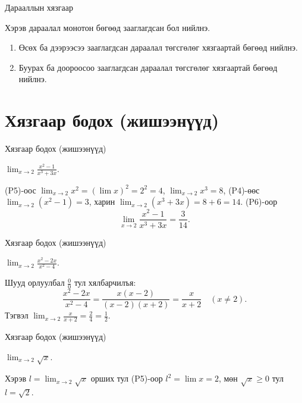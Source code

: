 \begin{frame}[allowframebreaks]{Дарааллын хязгаар}
\begin{theorem}\label{monton seq lim}
Хэрэв дараалал монотон бөгөөд зааглагдсан бол нийлнэ.  
\begin{enumerate}
\item Өсөх ба дээрээсээ зааглагдсан дараалал төгсгөлөг хязгаартай бөгөөд нийлнэ.  
\item Буурах ба доороосоо зааглагдсан дараалал төгсгөлөг хязгаартай бөгөөд нийлнэ.
\end{enumerate}
\end{theorem}
\end{frame}

\section{Хязгаар бодох (жишээнүүд)}
\begin{frame}[allowframebreaks]{Хязгаар бодох (жишээнүүд)}
\begin{example}
$\displaystyle \lim_{x\to 2}\frac{x^2-1}{x^3+3x}$.

(P5)-оос $\lim_{x\to 2}x^2=(\lim x)^2=2^2=4$, $\lim_{x\to 2}x^3=8$, (P4)-өөс $\lim_{x\to 2}(x^2-1)=3$, харин $\lim_{x\to 2}(x^3+3x)=8+6=14$. (P6)-оор
\[
\lim_{x\to 2}\frac{x^2-1}{x^3+3x}=\frac{3}{14}.
\]
\end{example}
\end{frame}

\begin{frame}[allowframebreaks]{Хязгаар бодох (жишээнүүд)}
\begin{example}
$\displaystyle \lim_{x\to 2}\frac{x^2-2x}{x^2-4}$.

Шууд орлуулбал $\frac{0}{0}$ тул хялбарчилъя:
\[
\frac{x^2-2x}{x^2-4}=\frac{x(x-2)}{(x-2)(x+2)}=\frac{x}{x+2}\quad (x\neq 2).
\]
Тэгвэл $\displaystyle \lim_{x\to 2}\frac{x}{x+2}=\frac{2}{4}=\frac12$.
\end{example}
\end{frame}

\begin{frame}[allowframebreaks]{Хязгаар бодох (жишээнүүд)}
\begin{example}
$\displaystyle \lim_{x\to 2}\sqrt{x}$.

Хэрэв $l=\lim_{x\to 2}\sqrt{x}$ орших тул (P5)-оор $l^2=\lim x=2$, мөн $\sqrt{x}\ge 0$ тул $l=\sqrt{2}$.
\end{example}
\end{frame}

